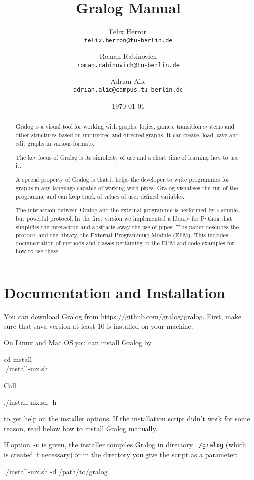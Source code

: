 \documentclass{article}
\title{Gralog Manual}
\author{Felix Herron\\\texttt{felix.herron@tu-berlin.de}
  \and Roman Rabinovich\\ \texttt{roman.rabinovich@tu-berlin.de}
\and Adrian Alic\\ \texttt{adrian.alic@campus.tu-berlin.de}}
\date{\today}
\newcounter{example}
\begin{document}
\maketitle


\begin{abstract}
Gralog is a visual tool for working with graphs, logics, games,
transition systems and other structures based on undirected and
directed graphs. It can create, load, save and edit graphs in
various formats.

The key focus of Gralog is its simplicity of use and a short time of
learning how to use it.

A special property of Gralog is that it helps the developer to write
programmes for graphs in any language capable of working with
pipes. Gralog visualises the run of the programme and can keep track
of values of user defined variables.

The interaction between Gralog and the external programme is
performed by a simple, but powerful protocol. In the first version
we implemented a library for Python that simplifies the interaction
and abstracts away the use of pipes. This paper describes the
protocol and the library, the External Programming Module (EPM). This
includes documentation of methods and classes pertaining to the
EPM and code examples for how to use these.
\end{abstract}

\section{Documentation and Installation}

You can download Gralog from \url{https://github.com/gralog/gralog}.
First, make sure that Java version at least 10 is installed on your
machine.

On Linux and Mac OS you can install Gralog by
\\\begin{tcolorbox}
  cd install\\
  ./install-nix.sh
\end{tcolorbox}

Call
\\\begin{tcolorbox}
  ./install-nix.sh -h
\end{tcolorbox}
to get help on the installer options. If the installation script
didn't work for some reason, read below how to install Gralog manually.

If option \texttt{-c} is given, the installer compiles Gralog in
directory \texttt{~/gralog} (which is created if necessary) or in the directory you give the script as a parameter:
\\\begin{tcolorbox}
  ./install-nix.sh -d /path/to/gralog
\end{tcolorbox}
\end{document}

